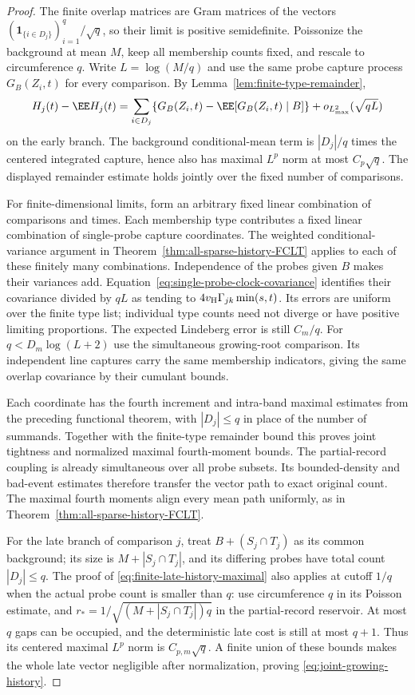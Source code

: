 \documentclass[11pt,letterpaper]{article}
\newcommand{\ind}{\mathbf 1}\newcommand{\Exp}{\operatorname{Exp}}
\begin{document}
\begin{proof}
The finite overlap matrices are Gram matrices of the vectors
$(\ind_{\{i\in D_j\}})_{i=1}^q/\sqrt q$, so their limit is
positive semidefinite.
Poissonize the background at mean $M$, keep all membership
counts fixed, and rescale to circumference $q$.
Write $L=\log(M/q)$ and use the same probe capture process
$G_B(Z_i,t)$ for every comparison.
By Lemma~\ref{lem:finite-type-remainder},
\[
 H_j(t)-\EE H_j(t)
   =\sum_{i\in D_j}
        \{G_B(Z_i,t)-\EE[G_B(Z_i,t)\mid B]\}
      +o_{L^2_{\rm max}}(\sqrt{qL})
\]
on the early branch. The background conditional-mean term
is $|D_j|/q$ times the centered integrated capture, hence
also has maximal $L^p$ norm at most $C_p\sqrt q$.
The displayed remainder estimate holds jointly over the
fixed number of comparisons.

For finite-dimensional limits, form an arbitrary fixed
linear combination of comparisons and times.
Each membership type contributes a fixed linear combination
of single-probe capture coordinates.
The weighted conditional-variance argument in
Theorem~\ref{thm:all-sparse-history-FCLT} applies to each of
these finitely many combinations.
Independence of the probes given $B$ makes their variances
add. Equation~\eqref{eq:single-probe-clock-covariance} identifies
their covariance divided by $qL$ as tending to
$4v_{\rm H}\Gamma_{jk}\min(s,t)$.
Its errors are uniform over the finite type list; individual
type counts need not diverge or have positive limiting proportions.
The expected Lindeberg error is still $C_m/q$.
For $q<D_m\log(L+2)$ use the simultaneous growing-root
comparison. Its independent line captures carry the same
membership indicators, giving the same overlap covariance
by their cumulant bounds.

Each coordinate has the fourth increment and intra-band
maximal estimates from the preceding functional theorem,
with $|D_j|\le q$ in place of the number of summands.
Together with the finite-type remainder bound this proves
joint tightness and normalized maximal fourth-moment bounds.
The partial-record coupling is already simultaneous over
all probe subsets. Its bounded-density and bad-event estimates
therefore transfer the vector path to exact original count.
The maximal fourth moments align every mean path uniformly,
as in Theorem~\ref{thm:all-sparse-history-FCLT}.

For the late branch of comparison $j$, treat
$B+(S_j\cap T_j)$ as its common background; its size is
$M+|S_j\cap T_j|$, and its differing probes have total
count $|D_j|\le q$.
The proof of \eqref{eq:finite-late-history-maximal} also
applies at cutoff $1/q$ when the actual probe count is
smaller than $q$: use circumference $q$ in its Poisson
estimate, and $r_*=1/\sqrt{(M+|S_j\cap T_j|)q}$ in the
partial-record reservoir. At most $q$ gaps can be occupied,
and the deterministic late cost is still at most $q+1$.
Thus its centered maximal $L^p$ norm is $C_{p,m}\sqrt q$.
A finite union of these bounds makes the whole late vector
negligible after normalization, proving
\eqref{eq:joint-growing-history}.


\end{proof}
\end{document}
